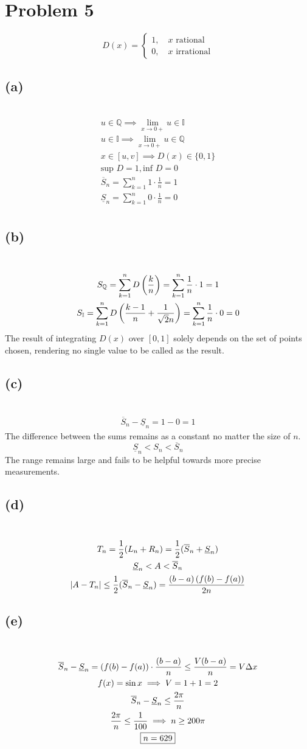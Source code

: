 \documentclass[12pt]{article}
\newcommand*{\paren}[1]{\ensuremath\left(#1\right)}
\newcommand{\vem}{\vspace{0.5em}}
\newcommand{\problem}[1]{\section{Problem #1}}
\newcommand{\subproblem}[1]{\subsection{(#1)} \,}
\begin{document}
\problem{5}

\[
D(x)=\begin{cases}
    1,\quad x \text{ rational}\\
    0,\quad x \text{ irrational}
\end{cases}
\]

\subproblem{a}
\begin{gather*}
    u\in \mathbb{Q} \implies \lim_{x \to 0+}u\in \mathbb{I}\\
    u\in \mathbb{I} \implies \lim_{x \to 0+}u\in \mathbb{Q}\\
    x\in [u,v] \implies D(x)\in \{0,1\}\\
    \text{sup }D=1, \text{inf } D=0\\
    \overline{S}_n=\sum_{k=1}^n1\cdot \frac{1}{n}=1\\
    \underline{S}_n=\sum_{k=1}^n0\cdot \frac{1}{n}=0\\
\end{gather*}

\subproblem{b}
\begin{gather*}
    S_{\mathbb{Q}}= \sum_{k=1}^n D\paren{\frac{k}{n}}= \sum_{k=1}^n \frac{1}{n}\cdot 1=1\\
    S_{\mathbb{I}}= \sum_{k=1}^n D\paren{\frac{k-1}{n}+\frac{1}{\sqrt{2}n}}= \sum_{k=1}^n \frac{1}{n}\cdot 0=0\\
\end{gather*}
The result of integrating $D(x)$ over $[0,1]$ solely depends on the set of points chosen, rendering no single value to be called as the result. \vem

\subproblem{c}
\begin{gather*}
    \overline{S}_n-\underline{S}_n=1-0=1
\end{gather*}
The difference between the sums remains as a constant no matter the size of $n$.
\[
\underline{S}_n<S_n<\overline{S}_n
\]
The range remains large and fails to be helpful towards more precise measurements. \vem

\subproblem{d}
\begin{gather*}
    T_n=\frac{1}{2}(L_n+R_n)=\frac{1}{2}(\overline{S}_n+\underline{S}_n)\\
    \underline{S}_n<A<\overline{S}_n\\
    |A-T_n| \le \frac{1}{2}(\overline{S}_n-\underline{S}_n)=\frac{(b-a)\paren{f(b)-f(a)}}{2n}
\end{gather*}

\subproblem{e}
\begin{gather*}
    \overline{S}_n-\underline{S}_n=\paren{f(b)-f(a)}\cdot \frac{(b-a)}{n}\le \frac{V(b-a)}{n}=V \Delta x\\
    f(x)=\sin x\implies V =1+1=2\\
    \overline{S}_n-\underline{S}_n\le \frac{2\pi}{n}\\
    \frac{2\pi}{n} \le \frac{1}{100} \implies n \ge 200\pi\\
    \boxed{n=629}
\end{gather*}
\end{document}
